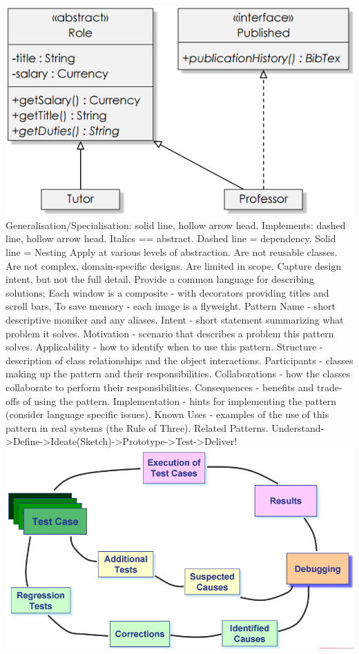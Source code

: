 \documentclass[number]{assignment}
\begin{document}
\begin{landscape}
\begin{multicols}{3}
\includegraphics[width=\linewidth]{inheritance.png}
Generalisation/Specialisation: solid line, hollow arrow head. Implements: dashed line, hollow arrow head. Italics == abstract.
Dashed line = dependency. Solid line = Nesting
Apply at various levels of abstraction. Are not reusable classes. Are not complex, domain-specific designs. Are limited in scope. Capture design intent, but not the full detail.
Provide a common language for describing solutions; Each window is a composite - with decorators providing titles and scroll bars, To save memory - each image is a flyweight.
Pattern Name - short descriptive moniker and any aliases. Intent - short statement summarizing what problem it solves. Motivation - scenario that describes a problem this pattern solves. Applicability - how to identify when to use this pattern. Structure - description of class relationships and the object interactions. Participants - classes making up the pattern and their responsibilities. Collaborations - how the classes collaborate to perform their responsibilities. Consequences - benefits and trade-offs of using the pattern. Implementation - hints for implementing the pattern (consider language specific issues). Known Uses - examples of the use of this pattern in real systems (the Rule of Three). Related Patterns.
Understand->Define->Ideate(Sketch)->Prototype->Test->Deliver!
\includegraphics[width=\linewidth]{DebugProcess.png}

\end{multicols}
\end{landscape}
\end{document}
